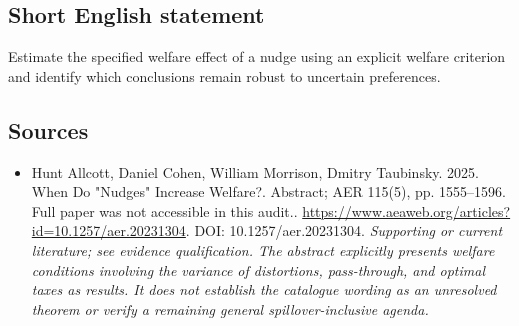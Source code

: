 \documentclass[11pt]{article}
\begin{document}
\subsection{Short English statement}
Estimate the specified welfare effect of a nudge using an explicit welfare criterion and identify which conclusions remain robust to uncertain preferences.

\subsection{Sources}
\begin{itemize}\raggedright
\item[\textnormal{[S1]}]\hypertarget{source:30007591:1}{} Hunt Allcott, Daniel Cohen, William Morrison, Dmitry Taubinsky. 2025. When Do "Nudges" Increase Welfare?. Abstract; AER 115(5), pp. 1555–1596. Full paper was not accessible in this audit..
\url{https://www.aeaweb.org/articles?id=10.1257/aer.20231304}.
DOI: 10.1257/aer.20231304.
{\small\textit{Supporting or current literature; see evidence qualification. The abstract explicitly presents welfare conditions involving the variance of distortions, pass-through, and optimal taxes as results. It does not establish the catalogue wording as an unresolved theorem or verify a remaining general spillover-inclusive agenda.}}
\end{itemize}
\end{document}
